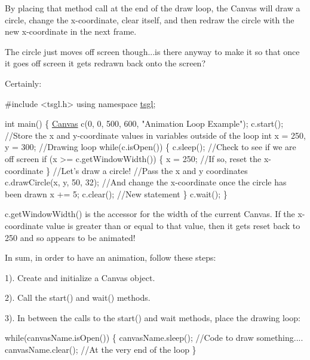 By placing that method call at the end of the draw loop, the Canvas will draw a circle, change the x-\/coordinate, clear itself, and then redraw the circle with the new x-\/coordinate in the next frame.

The circle just moves off screen though...is there anyway to make it so that once it goes off screen it gets redrawn back onto the screen?

Certainly\+:


\begin{DoxyCode}
\textcolor{preprocessor}{#include <tsgl.h>}
\textcolor{keyword}{using namespace }\hyperlink{namespacetsgl}{tsgl};

\textcolor{keywordtype}{int} main() \{
  \hyperlink{classtsgl_1_1_canvas}{Canvas} c(0, 0, 500, 600, \textcolor{stringliteral}{"Animation Loop Example"});
  c.start();
  \textcolor{comment}{//Store the x and y-coordinate values in variables outside of the loop}
  \textcolor{keywordtype}{int} x = 250, y = 300;
  \textcolor{comment}{//Drawing loop}
  \textcolor{keywordflow}{while}(c.isOpen()) \{
    c.sleep();
    \textcolor{comment}{//Check to see if we are off screen}
    \textcolor{keywordflow}{if} (x >= c.getWindowWidth()) \{
       x = 250; \textcolor{comment}{//If so, reset the x-coordinate}
    \}
    \textcolor{comment}{//Let's draw a circle!}
    \textcolor{comment}{//Pass the x and y coordinates}
    c.drawCircle(x, y, 50, 32);
    \textcolor{comment}{//And change the x-coordinate once the circle has been drawn}
    x += 5;
    c.clear(); \textcolor{comment}{//New statement}
  \}
  c.wait();
\}
\end{DoxyCode}


c.\+get\+Window\+Width() is the accessor for the width of the current Canvas. If the x-\/coordinate value is greater than or equal to that value, then it gets reset back to 250 and so appears to be animated!

In sum, in order to have an animation, follow these steps\+:

1). Create and initialize a Canvas object.

2). Call the start() and wait() methods.

3). In between the calls to the start() and wait methods, place the drawing loop\+: 
\begin{DoxyCode}
\textcolor{keywordflow}{while}(canvasName.isOpen()) \{
  canvasName.sleep();
  \textcolor{comment}{//Code to draw something....}
  canvasName.clear(); \textcolor{comment}{//At the very end of the loop}
\}
\end{DoxyCode}


